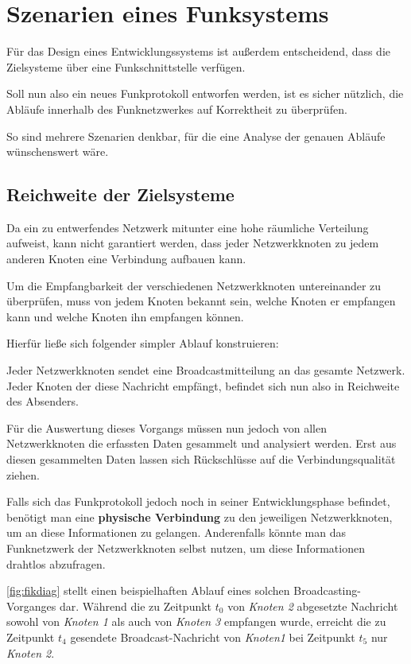 \section{Szenarien eines Funksystems}\label{sect:szenarien}
Für das Design eines Entwicklungssystems ist außerdem entscheidend, dass die
Zielsysteme über eine Funkschnittstelle verfügen.

Soll nun also ein neues Funkprotokoll entworfen werden, ist es sicher nützlich,
die Abläufe innerhalb des Funknetzwerkes auf Korrektheit zu überprüfen.

So sind mehrere Szenarien denkbar, für die eine Analyse der genauen Abläufe
wünschenswert wäre.

\subsection{Reichweite der Zielsysteme}
Da ein zu entwerfendes Netzwerk mitunter eine hohe räumliche Verteilung
aufweist, kann nicht garantiert werden, dass jeder Netzwerkknoten zu jedem
anderen Knoten eine Verbindung aufbauen kann.

Um die Empfangbarkeit der verschiedenen Netzwerkknoten untereinander zu
überprüfen, muss von jedem Knoten bekannt sein, welche Knoten er empfangen kann
und welche Knoten ihn empfangen können.

Hierfür ließe sich folgender simpler Ablauf konstruieren:

Jeder Netzwerkknoten sendet eine Broadcastmitteilung an das gesamte Netzwerk.
Jeder Knoten der diese Nachricht empfängt, befindet sich nun also in Reichweite
des Absenders.

Für die Auswertung dieses Vorgangs müssen nun jedoch von allen Netzwerkknoten
die erfassten Daten gesammelt und analysiert werden. Erst aus diesen gesammelten
Daten lassen sich Rückschlüsse auf die Verbindungsqualität ziehen.

Falls sich das Funkprotokoll jedoch noch in seiner Entwicklungsphase befindet,
benötigt man eine \textbf{physische Verbindung} zu den jeweiligen
Netzwerkknoten, um an diese Informationen zu gelangen. Anderenfalls könnte man
das Funknetzwerk der Netzwerkknoten selbst nutzen, um diese Informationen
drahtlos abzufragen.

\autoref{fig:fikdiag} stellt einen beispielhaften Ablauf eines solchen
Broadcasting-Vorganges dar. Während die zu Zeitpunkt $t_0$ von \emph{Knoten 2}
abgesetzte Nachricht sowohl von \emph{Knoten 1} als auch von \emph{Knoten 3}
empfangen wurde, erreicht die zu Zeitpunkt $t_4$ gesendete Broadcast-Nachricht
von \emph{Knoten1} bei Zeitpunkt $t_5$ nur \emph{Knoten 2}.

